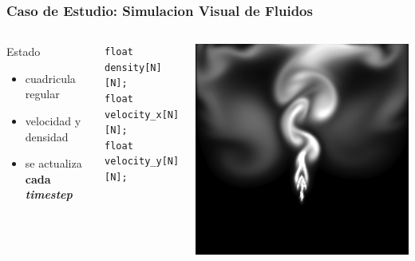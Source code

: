 \documentclass{beamer}\usetheme{Madrid} %
\begin{document}
\begin{frame}[fragile]
\frametitle{Caso de Estudio: Simulacion Visual de Fluidos}
\begin{columns}
\begin{block}{Estado}
	\begin{itemize}
		\item cuadricula regular
		\item velocidad y densidad
		\item se actualiza \textbf{cada \textit{timestep}}
	\end{itemize}
\end{block}
\begin{block}{}
\begin{center}
\begin{verbatim}
float density[N][N]; 
float velocity_x[N][N];
float velocity_y[N][N];
\end{verbatim}
\end{center}
\end{block}
\begin{center}
\includegraphics[scale=0.20]{img/saved_ssnapshot.png}
\end{center}

\end{columns}
\end{frame}
\end{document}
